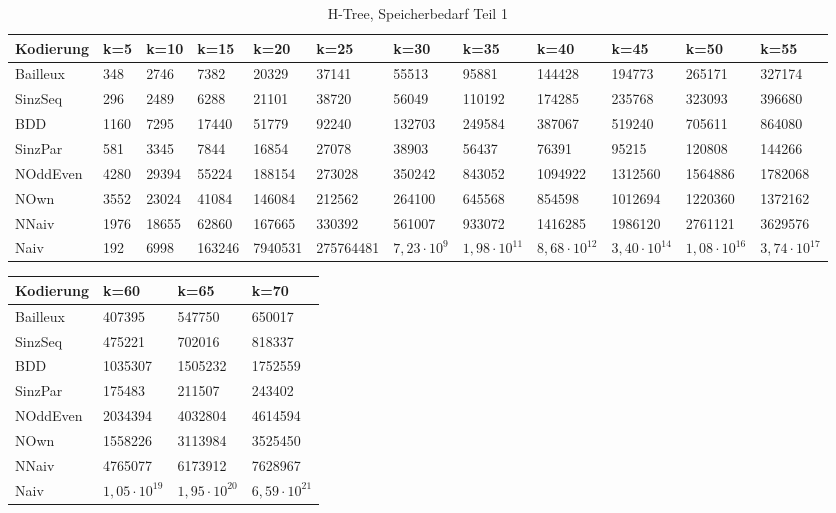 \documentclass[a4,abstract=on]{scrartcl}
\begin{document}
\begin{landscape}
 \begin{table}[h!]
    \small
    \setlength{\tabcolsep}{0.11cm}
     \centering
     \begin{tabular}[width=\textwidth]{|l||l|l|l|l|l|l|l|l|l|l|l|}
	\hline
       \textbf{Kodierung}  & \textbf{k=5} & \textbf{k=10} & \textbf{k=15} &\textbf{k=20} &\textbf{k=25} &\textbf{k=30} &\textbf{k=35} &\textbf{k=40} &\textbf{k=45} &\textbf{k=50} &\textbf{k=55}\\
	\hline
	\hline
	Bailleux & 348 & 2746 & 7382  & 20329 & 37141 & 55513 & 95881 & 144428 & 194773 & 265171 & 327174\\
\hline
	SinzSeq & 296 & 2489 & 6288 & 21101 & 38720 & 56049 & 110192 & 174285 & 235768 & 323093 & 396680 \\
\hline
	BDD & 1160 & 7295 & 17440 & 51779 & 92240 & 132703 & 249584 & 387067 & 519240 & 705611 & 864080 \\
\hline
	SinzPar & 581 & 3345 & 7844 & 16854 & 27078 & 38903 & 56437 & 76391 & 95215 & 120808 & 144266\\
\hline
	NOddEven & 4280 & 29394 & 55224 & 188154 & 273028 & 350242 & 843052 & 1094922 & 1312560 & 1564886 & 1782068\\
\hline
	NOwn & 3552 & 23024 & 41084 & 146084 & 212562 & 264100 & 645568 & 854598 & 1012694 & 1220360 & 1372162 \\
 \hline
	NNaiv & 1976 & 18655 & 62860 & 167665 & 330392 & 561007 & 933072 & 1416285 & 1986120 & 2761121 & 3629576 \\
\hline
	Naiv & 192 & 6998 & 163246 & 7940531 &  275764481 &  $7,23 \cdot 10^9 $&  $1,98 \cdot 10^{11}$ &  $8,68 \cdot 10^{12}$ &  $3,40 \cdot 10^{14}$ &  $1,08 \cdot 10^{16}$ &  $3,74 \cdot 10^{17}$ \\
\hline
       
     \end{tabular}

     \caption{H-Tree, Speicherbedarf Teil 1}
     \label{tbl:beispieltabelle}

   \end{table}

 \begin{table}[h!]
    \small
    \setlength{\tabcolsep}{0.11cm}
     \centering
     \begin{tabular}[width=\textwidth]{|l||l|l|l|}
	\hline
       \textbf{Kodierung}  &\textbf{k=60} &\textbf{k=65} &\textbf{k=70}\\
	\hline
	\hline
	Bailleux &  407395 & 547750 & 650017\\
\hline
	SinzSeq & 475221 & 702016 & 818337 \\
\hline
	BDD & 1035307 & 1505232 & 1752559\\
\hline
	SinzPar & 175483 & 211507 & 243402\\
\hline
	NOddEven & 2034394 & 4032804 & 4614594\\
\hline
	NOwn & 1558226 & 3113984 & 3525450\\
 \hline
	NNaiv &  4765077 & 6173912 & 7628967\\
\hline
	Naiv & $1,05 \cdot 10^{19}$ &  $1,95 \cdot 10^{20}$ &  $6,59 \cdot 10^{21}$\\
\hline
       

\end{tabular}
\end{table}
\end{landscape}
\end{document}
